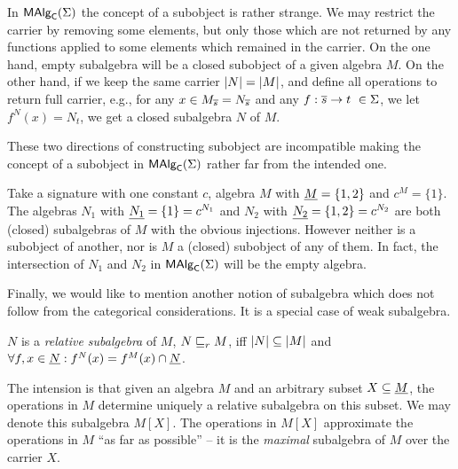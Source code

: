 \documentclass[10pt]{article}
\begin{document}

In $\mbox{\rm\sf MAlg}_{\sf C}(\Sigma)$ the concept of a subobject is rather strange.  We may
restrict the carrier by removing some elements, but only those which
are not returned by any functions applied to some elements which
remained in the carrier.  On the one hand, empty subalgebra will be a
closed subobject of a given algebra $M$. On the other hand, if we keep
the same carrier $|N|=|M|$, and define all operations to
return full carrier, e.g., for any $x\in M_{\overline {s}}=N_{\overline {s}}$
and any $f:{\overline {s}}\rightarrow t\ \in\Sigma$, we let $f^N(x)=N_t$, we
get a closed subalgebra $N$ of $M$.


These two directions of constructing subobject are incompatible making
the concept of a subobject in $\mbox{\rm\sf MAlg}_{\sf C}(\Sigma)$ rather far from the intended
one.

\begin{Example}
\label{ex:nointersect}
Take a signature with one constant $c$, algebra $M$ with $\underline {M}=\{1,2\}$ and $c^M=\{1\}$.  The algebras $N_1$ with
$\underline {N_1}=\{1\}=c^{N_{1}}$ and $N_2$ with
$\underline {N_2}=\{1,2\}=c^{N_{2}}$ are both (closed) subalgebras of $M$
with the obvious injections. However neither is a subobject of
another, nor is $M$ a (closed) subobject of any of them. In fact, the
intersection of $N_1$ and $N_2$ in $\mbox{\rm\sf MAlg}_{\sf C}(\Sigma)$ will be the empty algebra.
\end{Example}
%
Finally, we would like to mention another notion of subalgebra which
does not follow from the categorical considerations. It is a special
case of weak subalgebra.

\begin{Definition}\label{de:relative}
$N$ is a {\em relative subalgebra} of $M$, $N\mathrel{\sqsubseteq}_r M$, iff $|N|\subseteq|M|$ and $\forall f, x\in\underline {N}:
f^N(x)=f^M(x)\cap\underline {N}$.
\end{Definition}
%
The intension is that given an algebra $M$ and an arbitrary subset
$X\subseteq\underline {M}$, the operations in $M$ determine uniquely a
relative subalgebra on this subset. We may denote this subalgebra
$M[X]$.  The operations in $M[X]$ approximate the operations in $M$
``as far as possible'' -- it is the {\em maximal} subalgebra of $M$
over the carrier $X$.
\end{document}
